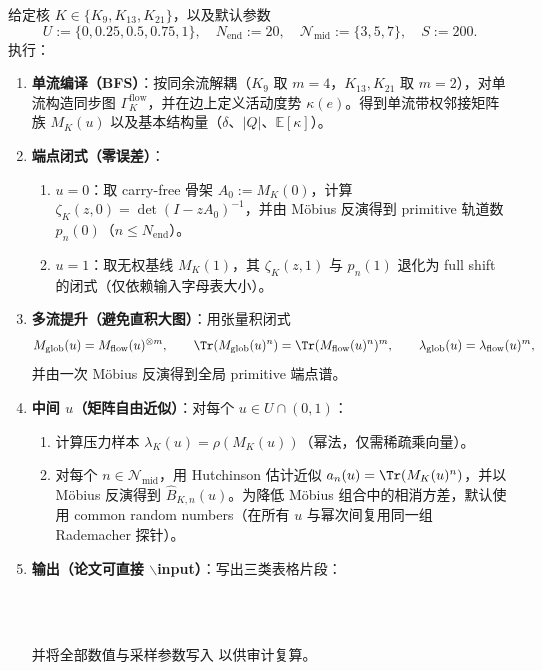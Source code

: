 \begin{algorithm}[核指纹实验协议]\label{alg:kernel-fingerprint-protocol}
给定核 $K\in\{K_9,K_{13},K_{21}\}$，以及默认参数
\[
U:=\{0,0.25,0.5,0.75,1\},\quad N_{\mathrm{end}}:=20,\quad \mathcal{N}_{\mathrm{mid}}:=\{3,5,7\},\quad S:=200.
\]
执行：
\begin{enumerate}
  \item \textbf{单流编译（BFS）}：按同余流解耦（$K_9$ 取 $m=4$，$K_{13},K_{21}$ 取 $m=2$），对单流构造同步图 $\Gamma^{\mathrm{flow}}_K$，并在边上定义活动度势 $\kappa(e)$。得到单流带权邻接矩阵族 $M_K(u)$ 以及基本结构量（$\delta$、$|Q|$、$\mathbb{E}[\kappa]$）。
  \item \textbf{端点闭式（零误差）}：
  \begin{enumerate}
    \item $u=0$：取 carry-free 骨架 $A_0:=M_K(0)$，计算 $\zeta_K(z,0)=\det(I-zA_0)^{-1}$，并由 Möbius 反演得到 primitive 轨道数 $p_n(0)$（$n\le N_{\mathrm{end}}$）。
    \item $u=1$：取无权基线 $M_K(1)$，其 $\zeta_K(z,1)$ 与 $p_n(1)$ 退化为 full shift 的闭式（仅依赖输入字母表大小）。
  \end{enumerate}
  \item \textbf{多流提升（避免直积大图）}：用张量积闭式
  \[
  M_{\mathrm{glob}}(u)=M_{\mathrm{flow}}(u)^{\otimes m},\qquad
  \Tr(M_{\mathrm{glob}}(u)^n)=\Tr(M_{\mathrm{flow}}(u)^n)^m,\qquad
  \lambda_{\mathrm{glob}}(u)=\lambda_{\mathrm{flow}}(u)^m,
  \]
  并由一次 Möbius 反演得到全局 primitive 端点谱。
  \item \textbf{中间 $u$（矩阵自由近似）}：对每个 $u\in U\cap(0,1)$：
  \begin{enumerate}
    \item 计算压力样本 $\lambda_K(u)=\rho(M_K(u))$（幂法，仅需稀疏乘向量）。
    \item 对每个 $n\in\mathcal{N}_{\mathrm{mid}}$，用 Hutchinson 估计近似 $a_n(u)=\Tr(M_K(u)^n)$，并以 Möbius 反演得到 $\widehat B_{K,n}(u)$。为降低 Möbius 组合中的相消方差，默认使用 common random numbers（在所有 $u$ 与幂次间复用同一组 Rademacher 探针）。
  \end{enumerate}
  \item \textbf{输出（论文可直接 \texorpdfstring{$\backslash$}{\textbackslash}input）}：写出三类表格片段：
  \begin{center}
  \\
  \\
  \end{center}
  并将全部数值与采样参数写入  以供审计复算。
\end{enumerate}
\end{algorithm}

